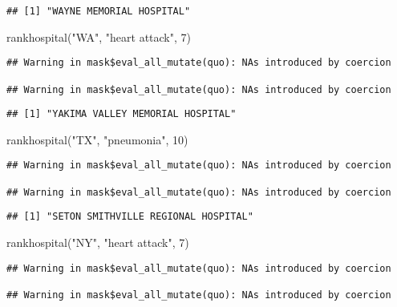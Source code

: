 \documentclass[
]{article}
\newenvironment{Shaded}{\begin{snugshade}}{\end{snugshade}}
\newcommand{\DecValTok}[1]{\textcolor[rgb]{0.00,0.00,0.81}{#1}}
\newcommand{\FunctionTok}[1]{\textcolor[rgb]{0.00,0.00,0.00}{#1}}
\newcommand{\NormalTok}[1]{#1}
\newcommand{\StringTok}[1]{\textcolor[rgb]{0.31,0.60,0.02}{#1}}
\begin{document}
\begin{verbatim}
## [1] "WAYNE MEMORIAL HOSPITAL"
\end{verbatim}

\begin{Shaded}
\begin{Highlighting}[]
\FunctionTok{rankhospital}\NormalTok{(}\StringTok{"WA"}\NormalTok{, }\StringTok{"heart attack"}\NormalTok{, }\DecValTok{7}\NormalTok{)}
\end{Highlighting}
\end{Shaded}

\begin{verbatim}
## Warning in mask$eval_all_mutate(quo): NAs introduced by coercion

## Warning in mask$eval_all_mutate(quo): NAs introduced by coercion
\end{verbatim}

\begin{verbatim}
## [1] "YAKIMA VALLEY MEMORIAL HOSPITAL"
\end{verbatim}

\begin{Shaded}
\begin{Highlighting}[]
\FunctionTok{rankhospital}\NormalTok{(}\StringTok{"TX"}\NormalTok{, }\StringTok{"pneumonia"}\NormalTok{, }\DecValTok{10}\NormalTok{)}
\end{Highlighting}
\end{Shaded}

\begin{verbatim}
## Warning in mask$eval_all_mutate(quo): NAs introduced by coercion

## Warning in mask$eval_all_mutate(quo): NAs introduced by coercion
\end{verbatim}

\begin{verbatim}
## [1] "SETON SMITHVILLE REGIONAL HOSPITAL"
\end{verbatim}

\begin{Shaded}
\begin{Highlighting}[]
\FunctionTok{rankhospital}\NormalTok{(}\StringTok{"NY"}\NormalTok{, }\StringTok{"heart attack"}\NormalTok{, }\DecValTok{7}\NormalTok{)}
\end{Highlighting}
\end{Shaded}

\begin{verbatim}
## Warning in mask$eval_all_mutate(quo): NAs introduced by coercion

## Warning in mask$eval_all_mutate(quo): NAs introduced by coercion
\end{verbatim}
\end{document}
